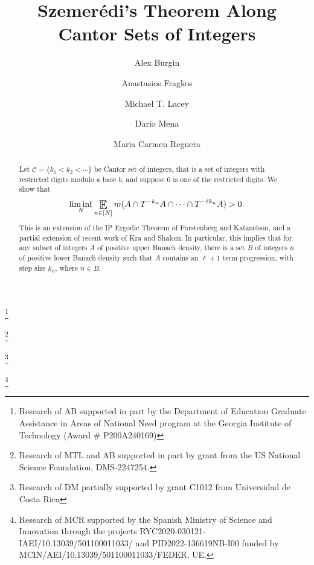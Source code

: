 \documentclass[12pt]{amsart}
\theoremstyle{plain} %
\theoremstyle{definition}
\theoremstyle{remark}
\numberwithin{equation}{section}
\DeclareMathOperator*{\Expectation}{\scalerel*{\mathbb{E}}{\textstyle\sum}}
\begin{document}
\title[Cantor Szemer\'edi Theorem]{Szemer\'edi's Theorem Along Cantor Sets of Integers}

\author[Burgin]{Alex Burgin} 
    \address{School of Mathematics, Georgia Institute of Technology, Atlanta GA 30332, USA}
    \thanks{Research of AB supported in part by the Department of Education Graduate Assistance in Areas of National Need program at the Georgia Institute of Technology (Award \# P200A240169)}


\author[Fragkos]{Anastasios Fragkos}
\address{ School of Mathematics, Georgia Institute of Technology, Atlanta GA 30332, USA}



\author[Lacey]{Michael T. Lacey} 
    \address{ School of Mathematics, Georgia Institute of Technology, Atlanta GA 30332, USA}
    \thanks{Research of MTL and AB supported in part by grant  from the US National Science Foundation, DMS-2247254.}

 \author[Mena]{Dario Mena}
    \address{Centro de Investigaci\'{o}n en Matem\'{a}tica Pura y Aplicada \\ Escuela de Matem\'{a}tica, Universidad de Costa Rica}
    \thanks{Research of DM partially supported by grant C1012 from Universidad de Costa Rica}

\author[Reguera]{Maria Carmen Reguera} \address{Universidad de M\'alaga}
    \thanks{Research of MCR supported by the Spanish Ministry of Science and Innovation through the projects RYC2020-030121-IAEI/10.13039/501100011033/ and PID2022-136619NB-I00 funded by MCIN/AEI/10.13039/501100011033/FEDER, UE.}
\begin{abstract}
    Let $\mathcal C= \{k_1<k_2 < \cdots\}$ be Cantor set of integers, that is a set of integers with restricted digits modulo a base $b$, and suppose $0$ is one of the restricted digits.  
We show that  
\begin{equation}
\liminf_N \Expectation_{n\in [N]}  m(A\cap T^{-k_n} A \cap \cdots 
        \cap T^{-\ell k_n} A )>0. 
\end{equation}
This is an extension of the IP Ergodic Theorem of Furstenberg and Katznelson, 
and a partial extension of recent work of Kra and Shalom. 
In particular, this implies that for any subset of integers $A$ of positive upper Banach density, 
there is a set $B$ of integers $n$ of positive lower Banach density 
such that $A$ contains an $\ell+1$ term progression, with step size $k_n$, where $n\in B$.    
\end{abstract}


\maketitle 




\tableofcontents 









 







 
\end{document}
